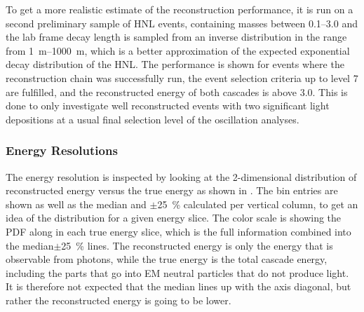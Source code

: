 To get a more realistic estimate of the reconstruction performance, it is run on a second preliminary sample of HNL events, containing masses between \SIrange[range-phrase=~and~]{0.1}{3.0}{\gev} and the lab frame decay length is sampled from an inverse distribution in the range from \SIrange{1}{1000}{\meter}, which is a better approximation of the expected exponential decay distribution of the HNL. The performance is shown for events where the reconstruction chain was successfully run, the event selection criteria up to level 7 are fulfilled, and the reconstructed energy of both cascades is above \SI{3.0}{\gev}. This is done to only investigate well reconstructed events with two significant light depositions at a usual final selection level of the oscillation analyses.


\subsubsection{Energy Resolutions} 

The energy resolution is inspected by looking at the 2-dimensional distribution of reconstructed energy versus the true energy as shown in . The bin entries are shown as well as the median and $\pm$\SI{25}{\percent} calculated per vertical column, to get an idea of the distribution for a given energy slice. The color scale is showing the PDF along in each true energy slice, which is the full information combined into the median$\pm$\SI{25}{\percent} lines. The reconstructed energy is only the energy that is observable from photons, while the true energy is the total cascade energy, including the parts that go into EM neutral particles that do not produce light. It is therefore not expected that the median lines up with the axis diagonal, but rather the reconstructed energy is going to be lower.

